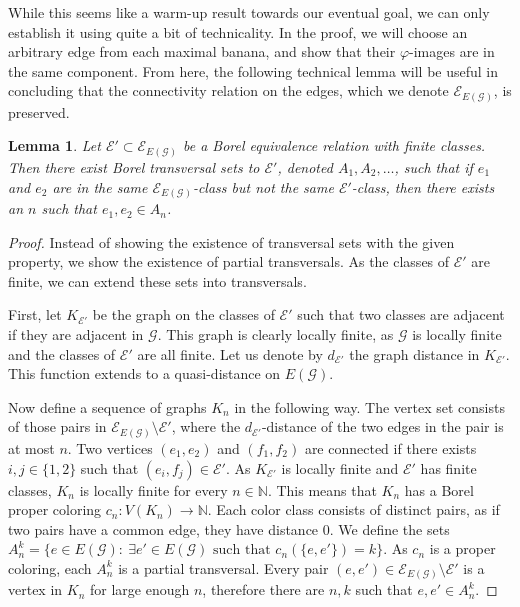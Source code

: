 \documentclass{article}
\theoremstyle{plain}
\newtheorem{lem}[thm]{Lemma}
\theoremstyle{definition}
\newcommand{\N}{\mathbb{N}}
\newcommand{\cG}{\mathcal{G}}
\newcommand{\cE}{\mathcal{E}}
\begin{document}
While this seems like a warm-up result towards our eventual goal, we can only establish it using quite a bit of technicality. In the proof, we will choose an arbitrary edge from each maximal banana, and show that their $\varphi$-images are in the same component. From here, the following technical lemma will be useful in concluding that the connectivity relation on the edges, which we denote $\cE_{E(\cG)}$, is preserved.

\begin{lem}\label{lem:union_of_pairs}
    Let $\cE'\subset \cE_{E(\cG)}$ be a Borel equivalence relation with finite classes. Then there exist Borel transversal sets to $\cE'$, denoted $A_1,A_2,\dots$, such that if 
    $e_1$ and $e_2$ are in the same $\cE_{E(\cG)}$-class but not the same $\cE'$-class, then there exists an $n$ such that $e_1,e_2\in A_n$.
\end{lem}
\begin{proof}
    Instead of showing the existence of transversal sets with the given property, we show the existence of partial transversals. As the classes of $\cE'$ are finite, we can extend these sets into transversals.
    
    First, let $K_{\cE'}$ be the graph on the classes of $\cE'$ such that two classes are adjacent if they are adjacent in $\cG$. This graph is clearly locally finite, as $\cG$ is locally finite and the classes of $\cE'$ are all finite. Let us denote by $d_{\cE'}$ the graph distance in $K_{\cE'}$. This function extends to a quasi-distance on $E(\cG)$. 
    
    Now define a sequence of graphs $K_n$ in the following way. The vertex set consists of those pairs in $\cE_{E(\cG)}\setminus \cE'$, where the $d_{\cE'}$-distance of the two edges in the pair is at most $n$. Two vertices $(e_1,e_2)$ and $(f_1,f_2)$ are connected if there exists $i,j\in\{1,2\}$ such that $(e_i,f_j)\in\cE'$.
    As $K_{\cE'}$ is locally finite and $\cE'$ has finite classes, $K_n$ is locally finite for every $n \in \N$. This means that $K_n$ has a Borel proper coloring $c_n:V(K_n)\to \N$. Each color class consists of distinct pairs, as if two pairs have a common edge, they have distance $0$. We define the sets $A_n^k=\{e\in E(\cG):\ \exists e'\in E(\cG) \text{ such that } c_n(\{e,e'\})=k \}$. As $c_n$ is a proper coloring, each $A_n^k$ is a partial transversal. Every pair $(e,e')\in\cE_{E(\cG)}\setminus\cE'$ is a vertex in $K_n$ for large enough $n$, therefore there are $n,k$ such that $e,e'\in A_{n}^k$.
\end{proof}
\end{document}

